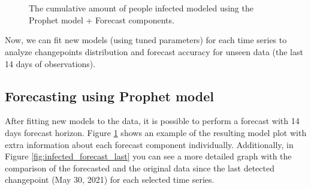 \begin{figure}[!htb]
  \centering
   \\
   \\
  \caption{The cumulative amount of people infected modeled using the Prophet model + Forecast components.}
  \label{fig:infected_forecast_fbp}
\end{figure}

Now, we can fit new models (using tuned parameters) for each time series to analyze changepoints distribution and forecast accuracy for unseen data (the last 14 days of observations).
\hypertarget{ss332}{\subsection{Forecasting using Prophet model}}

After fitting new models to the data, it is possible to perform a forecast with 14 days forecast horizon. Figure \ref{fig:infected_forecast_fbp} shows an example of the resulting model plot with extra information about each forecast component individually. Additionally, in Figure \ref{fig:infected_forecast_last} you can see a more detailed graph with the comparison of the forecasted and the original data since the last detected changepoint (May 30, 2021) for each selected time series.

